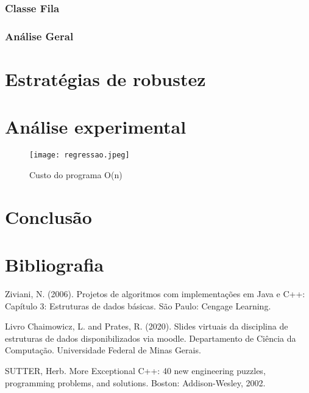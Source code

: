 \subsubsection{Classe Fila}

\subsubsection{Análise Geral}


\section{Estratégias de robustez}

\section{Análise experimental}

 \begin{figure}[H]
    \centering
    \texttt{[image: regressao.jpeg]}
    \caption{Custo do programa O(n)}
    \label{fig:minha-imagem}
\end{figure}
\vspace{1cm}




\section{Conclusão}


\section {Bibliografia}

Ziviani, N. (2006). Projetos de algoritmos com implementações em Java e C++: Capítulo 3: Estruturas de dados básicas. São Paulo: Cengage Learning.
\par Livro Chaimowicz, L. and Prates, R. (2020). Slides virtuais da disciplina de estruturas de dados
disponibilizados via moodle. Departamento de Ciência da Computação. Universidade Federal de
Minas Gerais.

\par SUTTER, Herb. More Exceptional C++: 40 new engineering puzzles, programming problems, and solutions. Boston: Addison-Wesley, 2002.

